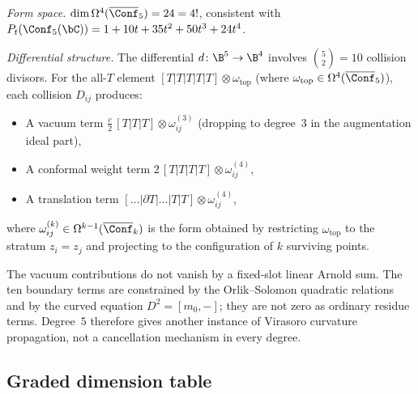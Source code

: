 \begin{computation}
\label{comp:virasoro-deg5}

\emph{Form space.}
$\dim \Omega^4(\overline{\Conf}_5) = 24 = 4!$, consistent with
$P_t(\Conf_5(\bC)) = 1 + 10t + 35t^2 + 50t^3 + 24t^4$.

\emph{Differential structure.}
The differential $d\colon \B^5 \to \B^4$ involves $\binom{5}{2} = 10$
collision divisors. For the all-$T$ element
$[T|T|T|T|T] \otimes \omega_{\mathrm{top}}$
(where $\omega_{\mathrm{top}} \in \Omega^4(\overline{\Conf}_5)$),
each collision $D_{ij}$ produces:
\begin{itemize}
\item A vacuum term $\frac{c}{2}\,[T|T|T] \otimes \omega^{(3)}_{ij}$
 (dropping to degree~3 in the augmentation ideal part),
\item A conformal weight term
 $2\,[T|T|T|T] \otimes \omega^{(4)}_{ij}$,
\item A translation term
 $[\ldots|\partial T|\ldots|T|T] \otimes \omega^{(4)}_{ij}$,
\end{itemize}
where $\omega^{(k)}_{ij} \in \Omega^{k-1}(\overline{\Conf}_k)$ is the
form obtained by restricting $\omega_{\mathrm{top}}$ to the stratum
$z_i = z_j$ and projecting to the configuration of $k$ surviving points.

The vacuum contributions do not vanish by a fixed-slot linear Arnold
sum. The ten boundary terms are constrained by the Orlik--Solomon
quadratic relations and by the curved equation $D^2=[m_0,-]$; they are
not zero as ordinary residue terms. Degree~$5$ therefore gives another
instance of Virasoro curvature propagation, not a cancellation
mechanism in every degree.
\end{computation}

\subsection{Graded dimension table}

